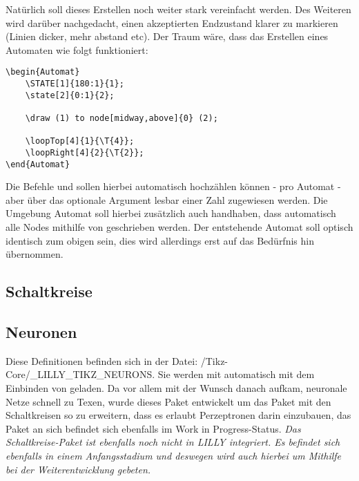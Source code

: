 Natürlich soll dieses Erstellen noch weiter stark vereinfacht werden. Des Weiteren wird darüber nachgedacht, einen akzeptierten Endzustand klarer zu markieren (Linien dicker, mehr abstand etc). Der Traum wäre, dass das Erstellen eines Automaten wie folgt funktioniert:
\begin{lstlisting}[language=lLatex]
\begin{Automat}
    \STATE[1]{180:1}{1};
    \state[2]{0:1}{2};

    \draw (1) to node[midway,above]{0} (2);

    \loopTop[4]{1}{\T{4}};
    \loopRight[4]{2}{\T{2}};
\end{Automat}
\end{lstlisting}
Die Befehle  und  sollen hierbei automatisch hochzählen können - pro Automat - aber über das optionale Argument lesbar einer Zahl zugewiesen werden. Die Umgebung Automat soll hierbei zusätzlich auch handhaben, dass automatisch alle Nodes mithilfe von  geschrieben werden. Der entstehende Automat soll optisch identisch zum obigen sein, dies wird allerdings erst auf das Bedürfnis hin übernommen.
\subsection{Schaltkreise }

\subsection{Neuronen }
Diese Definitionen befinden sich in der Datei: {\ltt\LILLYxPATHxGRAPHICS/Tikz-Core/\_LILLY\_TIKZ\_NEURONS}. Sie werden mit  automatisch mit dem Einbinden von\newline {} geladen.\medskip\newline
Da vor allem mit \fg der Wunsch danach aufkam, neuronale Netze schnell zu Texen, wurde dieses Paket entwickelt um das Paket mit den Schaltkreisen so zu erweitern, dass es erlaubt Perzeptronen darin einzubauen, das  Paket an sich befindet sich ebenfalls im Work in Progress-Status. \textit{Das Schaltkreise-Paket ist ebenfalls noch nicht in LILLY integriert. Es befindet sich ebenfalls in einem Anfangsstadium und deswegen wird auch hierbei um Mithilfe bei der Weiterentwicklung gebeten.}

%
%
%

